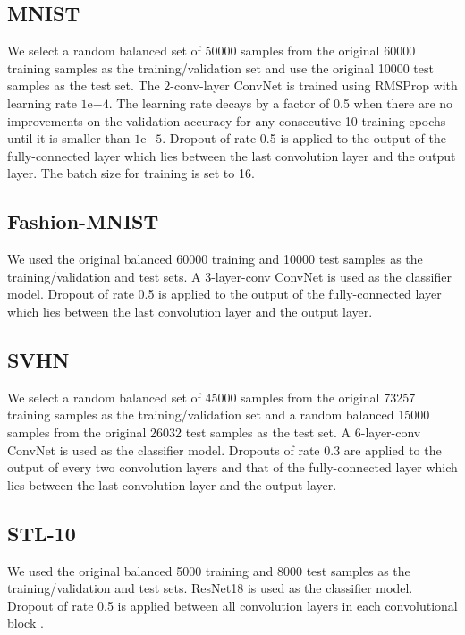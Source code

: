 \documentclass[runningheads, envcountsame, a4paper]{llncs}
\begin{document}
\subsection{MNIST \cite{Lecun10} }
We select a random balanced set of 50000 samples from the original 60000 training samples as the training/validation set and use the original 10000 test samples as the test set. The 2-conv-layer ConvNet is trained using RMSProp \cite{Tieleman12} with learning rate $1\mathrm{e}{-4}$. The learning rate decays by a factor of 0.5 when there are no improvements on the validation accuracy for any consecutive 10 training epochs until it is smaller than $1\mathrm{e}{-5}$. Dropout \cite{Srivastava14} of rate 0.5 is applied to the output of the fully-connected layer which lies between the last convolution layer and the output layer. The batch size for training is set to 16.

\subsection{Fashion-MNIST \cite{Xiao17} }
We used the original balanced 60000 training and 10000 test samples as the training/validation and test sets. A 3-layer-conv ConvNet is used as the classifier model. Dropout of rate 0.5 is applied to the output of the fully-connected layer which lies between the last convolution layer and the output layer. 

\subsection{SVHN \cite{Netzer11} }
We select a random balanced set of 45000 samples from the original 73257 training samples as the training/validation set and a random balanced 15000 samples from the original 26032 test samples as the test set. A 6-layer-conv ConvNet is used as the classifier model. Dropouts of rate 0.3 are applied to the output of every two convolution layers and that of the fully-connected layer which lies between the last convolution layer and the output layer. 

\subsection{STL-10 \cite{Coates11} }
We used the original balanced 5000 training and 8000 test samples as the training/validation and test sets. ResNet18 \cite{He16} is used as the classifier model. Dropout of rate 0.5 is applied between all convolution layers in each convolutional block \cite{Zagoruyko16}. 




\end{document}
